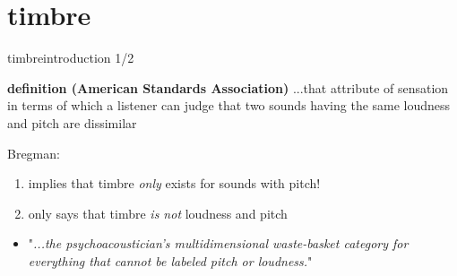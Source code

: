     \section{timbre}
        \begin{frame}{timbre}{introduction 1/2}
            \begin{block}{\textbf{definition (American Standards Association)}}
                ...that attribute of sensation in terms of which a listener can judge that two sounds having the same loudness and pitch are dissimilar
            \end{block}
            \vspace{1mm}
            \vspace{-3mm}
            Bregman:
                    \begin{enumerate}
                        \item   implies that timbre \textit{only} exists for sounds with pitch!
                        \item   only says that timbre \textit{is not} loudness and pitch
                    \end{enumerate}
            \pause
            
            \begin{itemize}
                \item[$\rightarrow$]   [timbre is] "\textit{...the psychoacoustician's multidimensional waste-basket category for everything that cannot be labeled pitch or loudness.}"
            \end{itemize}
        \end{frame}
        
